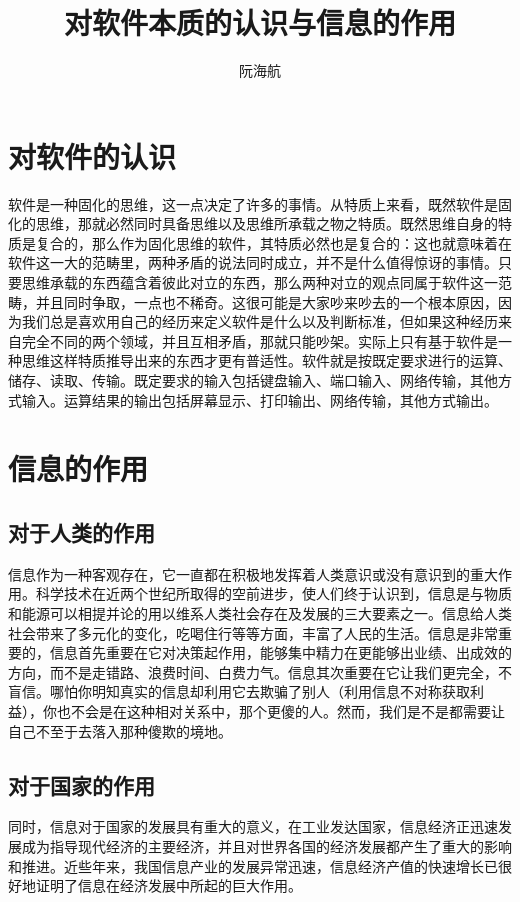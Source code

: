 \documentclass[UTF8,a4paper,10pt]{ctexart}
\title{\textbf{对软件本质的认识与信息的作用}}
\author{ 阮海航}
\begin{document}
    \maketitle

\section{对软件的认识}
软件是一种固化的思维，这一点决定了许多的事情。从特质上来看，既然软件是固化的思维，那就必然同时具备思维以及思维所承载之物之特质。既然思维自身的特质是复合的，那么作为固化思维的软件，其特质必然也是复合的：这也就意味着在软件这一大的范畴里，两种矛盾的说法同时成立，并不是什么值得惊讶的事情。只要思维承载的东西蕴含着彼此对立的东西，那么两种对立的观点同属于软件这一范畴，并且同时争取，一点也不稀奇。这很可能是大家吵来吵去的一个根本原因，因为我们总是喜欢用自己的经历来定义软件是什么以及判断标准，但如果这种经历来自完全不同的两个领域，并且互相矛盾，那就只能吵架。实际上只有基于软件是一种思维这样特质推导出来的东西才更有普适性。软件就是按既定要求进行的运算、储存、读取、传输。既定要求的输入包括键盘输入、端口输入、网络传输，其他方式输入。运算结果的输出包括屏幕显示、打印输出、网络传输，其他方式输出。

\section{信息的作用}
\subsection{对于人类的作用}
信息作为一种客观存在，它一直都在积极地发挥着人类意识或没有意识到的重大作用。科学技术在近两个世纪所取得的空前进步，使人们终于认识到，信息是与物质和能源可以相提并论的用以维系人类社会存在及发展的三大要素之一。信息给人类社会带来了多元化的变化，吃喝住行等等方面，丰富了人民的生活。信息是非常重要的，信息首先重要在它对决策起作用，能够集中精力在更能够出业绩、出成效的方向，而不是走错路、浪费时间、白费力气。信息其次重要在它让我们更完全，不盲信。哪怕你明知真实的信息却利用它去欺骗了别人（利用信息不对称获取利益），你也不会是在这种相对关系中，那个更傻的人。然而，我们是不是都需要让自己不至于去落入那种傻欺的境地。
\subsection{对于国家的作用}
同时，信息对于国家的发展具有重大的意义，在工业发达国家，信息经济正迅速发展成为指导现代经济的主要经济，并且对世界各国的经济发展都产生了重大的影响和推进。近些年来，我国信息产业的发展异常迅速，信息经济产值的快速增长已很好地证明了信息在经济发展中所起的巨大作用。
\end{document}
